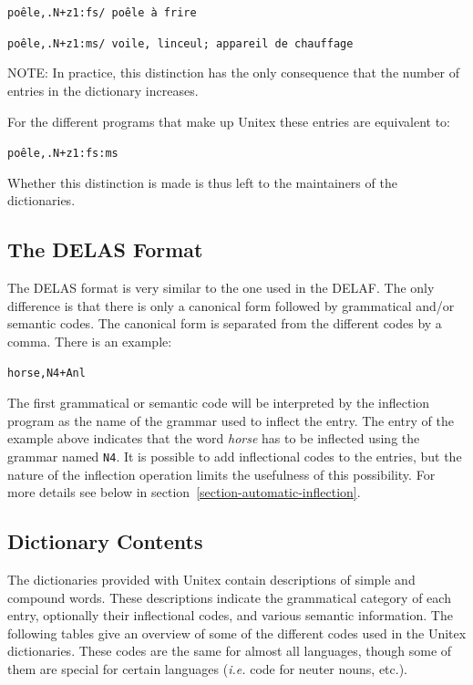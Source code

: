 \bigskip
\noindent
\texttt{po\^ele,.N+z1:fs/ po\^ele \`a frire}

\noindent
\texttt{po\^ele,.N+z1:ms/ voile, linceul; appareil de chauffage}

\bigskip 
\noindent NOTE: In practice, this distinction has the only consequence that the
number of entries in the dictionary increases.

\bigskip 
\noindent For the different programs that make up Unitex these entries are equivalent to:

\bigskip
\noindent
\texttt{po\^ele,.N+z1:fs:ms}

\bigskip 
\noindent Whether this distinction is made is thus left to the  maintainers of  the dictionaries.


\subsection{The DELAS Format}
\label{section-DELAS-format}

The DELAS format is very similar to the one used in the DELAF. The only
difference is that there is only a canonical form followed by grammatical
and/or semantic codes. The canonical form is separated from the different codes
by a comma. There is an example: \index{\verb+,+}

\begin{verbatim}
horse,N4+Anl
\end{verbatim}

\noindent The first grammatical or semantic code will be interpreted by the
inflection program as the name of the grammar used to inflect the entry. The entry of the
example above indicates that the word \textit{horse} has to be inflected using
the grammar named \verb+N4+. It is possible to add inflectional codes to the
entries, but the nature of the inflection operation limits the usefulness of this
possibility. For more details see below in
section~\ref{section-automatic-inflection}.


\subsection{Dictionary Contents}

The dictionaries provided with Unitex contain descriptions of simple and compound
words. These descriptions indicate the grammatical category of each entry,
optionally their inflectional codes, and various semantic information. The
following tables give an overview of some of the different codes used in the 
Unitex dictionaries. These codes are the same for almost all languages, though
some of them are special for certain languages (\textit{i.e.} code for neuter
nouns, etc.).

